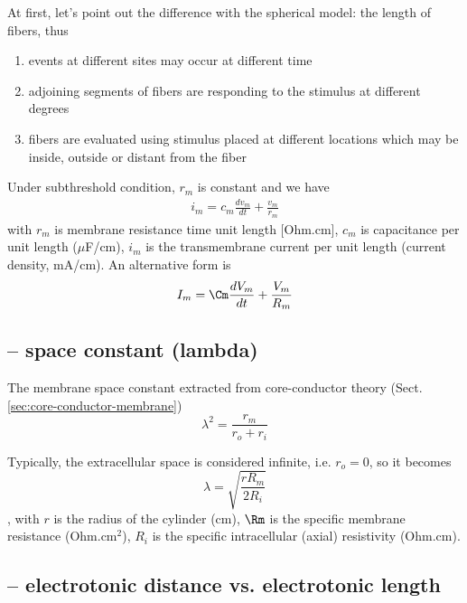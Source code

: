 At first, let's point out the difference with the spherical model: the
length of fibers, thus
\begin{enumerate}
\item  events at different sites may occur at
  different time
\item adjoining segments of fibers are responding to the stimulus at
  different degrees 
\item fibers are evaluated using stimulus placed at different
  locations which may be inside, outside or distant from the fiber
\end{enumerate}

Under subthreshold condition, $r_m$ is constant and we have
\begin{eqnarray}
  \label{eq:4061}
  i_m = c_m\frac{dv_m}{dt} + \frac{v_m}{r_m}
\end{eqnarray}
with $r_m$ is membrane resistance time unit length %
[Ohm.cm], $c_m$ is capacitance per unit length ($\mu$F/cm), $i_m$ is
the transmembrane current per unit length (current density, mA/cm). 
An alternative form is
\begin{eqnarray}
  \label{eq:523}
    I_m = \Cm\frac{dV_m}{dt} + \frac{V_m}{R_m}
\end{eqnarray}

\subsection{-- space constant (lambda)}
\label{sec:space-constant}

The membrane space constant extracted from core-conductor theory
(Sect.\ref{sec:core-conductor-membrane}) 
\begin{equation}
\lambda^2 = \frac{r_m}{r_o + r_i}
\end{equation}

Typically, the extracellular space is considered infinite, i.e. $r_o = 0$, so it
becomes
\begin{equation}
\lambda = \sqrt{\frac{r R_m}{2R_i}}
\end{equation},
with $r$ is the radius of the cylinder (cm), $\Rm$ is the specific membrane resistance
(Ohm.cm$^2$), $R_i$ is the specific intracellular (axial) resistivity (Ohm.cm).

\subsection{-- electrotonic distance vs. electrotonic length}
\label{sec:electrotonic-distance}

